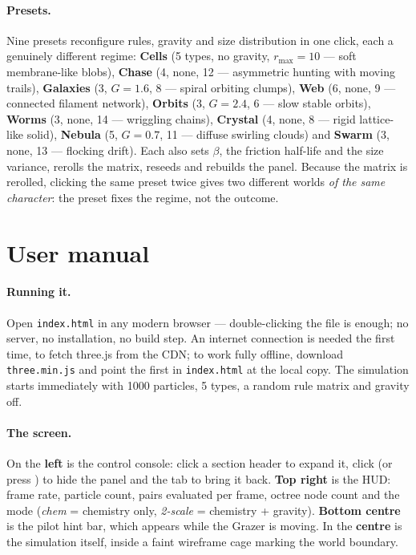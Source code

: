 \documentclass[10pt,a4paper]{article}
\newcommand{\code}[1]{\texttt{\small #1}}
\newcommand{\file}[1]{\texttt{\small\color{accent!70!black}#1}}
\newcommand{\keys}[1]{\textsf{\small\fbox{#1}}}
\begin{document}
\paragraph{Presets.} Nine presets reconfigure rules, gravity and size distribution in one click, each a
genuinely different regime: \textbf{Cells} (5 types, no gravity, $r_{\max}=10$ --- soft membrane-like blobs),
\textbf{Chase} (4, none, 12 --- asymmetric hunting with moving trails), \textbf{Galaxies} (3, $G=1.6$, 8 ---
spiral orbiting clumps), \textbf{Web} (6, none, 9 --- connected filament network), \textbf{Orbits} (3,
$G=2.4$, 6 --- slow stable orbits), \textbf{Worms} (3, none, 14 --- wriggling chains), \textbf{Crystal} (4,
none, 8 --- rigid lattice-like solid), \textbf{Nebula} (5, $G=0.7$, 11 --- diffuse swirling clouds) and
\textbf{Swarm} (3, none, 13 --- flocking drift). Each also sets $\beta$, the friction half-life and the size
variance, rerolls the matrix, reseeds and rebuilds the panel. Because the matrix is rerolled, clicking the
same preset twice gives two different worlds \emph{of the same character}: the preset fixes the regime, not
the outcome.

\section{User manual}
\label{sec:manual}

\paragraph{Running it.} Open \file{index.html} in any modern browser --- double-clicking the file is
enough; no server, no installation, no build step. An internet connection is needed the first time, to
fetch three.js from the CDN; to work fully offline, download \code{three.min.js} and point the first
\code{<script src>} in \file{index.html} at the local copy. The simulation starts immediately with 1000
particles, 5 types, a random rule matrix and gravity off.

\paragraph{The screen.} On the \textbf{left} is the control console: click a section header to expand it,
click \keys{$\blacktriangleleft$} (or press \keys{H}) to hide the panel and the \keys{$\equiv$} tab to bring
it back. \textbf{Top right} is the HUD: frame rate, particle count, pairs evaluated per frame, octree node
count and the mode (\emph{chem} = chemistry only, \emph{2-scale} = chemistry + gravity). \textbf{Bottom
centre} is the pilot hint bar, which appears while the Grazer is moving. In the \textbf{centre} is the
simulation itself, inside a faint wireframe cage marking the world boundary.
\end{document}
